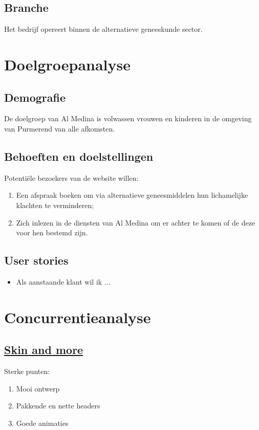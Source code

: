 \documentclass{article}
\begin{document}
\subsection{Branche}
Het bedrijf opereert binnen de alternatieve geneeskunde sector.

\pagebreak

\section{Doelgroepanalyse}
\subsection{Demografie}
De doelgroep van Al Medina is volwassen vrouwen en kinderen in de omgeving van Purmerend van alle afkomsten.

\subsection{Behoeften en doelstellingen}
Potentiële bezoekers van de website willen:
\begin{enumerate}
    \item Een afspraak boeken om via alternatieve geneesmiddelen hun lichamelijke klachten te verminderen;
    \item Zich inlezen in de diensten van Al Medina om er achter te komen of de deze voor hen bestemd zijn.
\end{enumerate}

\subsection{User stories}
\begin{itemize}
    \item Als aanstaande klant wil ik ...
\end{itemize}

\pagebreak

\section{Concurrentieanalyse}
\subsection{\href{https://www.skinandmore.nl/}{Skin and more}} 

Sterke punten:
\begin{enumerate}
    \item Mooi ontwerp
    \item Pakkende en nette headers
    \item Goede animaties
\end{enumerate}
\end{document}
